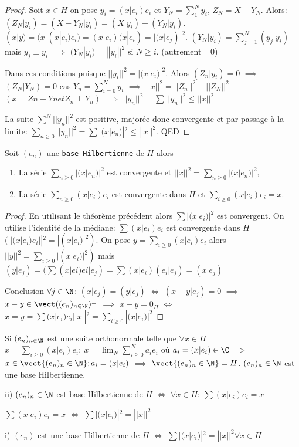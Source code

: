 \begin{proof}
	Soit $x\in H$ on pose $y_i=(x|e_i)e_i$ et $Y_N=∑_1^Ny_i$, $Z_N=X-Y_N$. Alors: $(Z_N|y_i)=(X-Y_N|y_i)=(X|y_i)-(Y_N|y_i)$. $(x|y)=(x|(x|e_i)e_i)=\overline{(x|e_i)}(x|e_i)=|(x|e_j)|^2$. $(Y_N|y_i)=∑_{j=1}^N(y_j|y_i)$ mais $y_j\perp y_i$ $\implies$  $(Y_N|y_i) =||y_i||^2$ si $N≥i$.
	(autrement =0)

Dans ces conditions puisque $||y_i||^2=|(x|e_i)|^2$. Alors $(Z_n|y_i)=0$ $\implies$  $(Z_N|Y_N)=0$ cas $Y_n=∑_{i=0}^Ny_i$ $\implies$  $||x||^2=||Z_n||^2+||Z_N||^2$ $(x=Zn+Yn et Z_n\perp Y_n)$
$\implies$  $||y_n||^2=∑||y_n||^2≤||x||^2$


La suite $∑^N||y_n||^2$ est positive, majorée donc convergente et par passage à la limite: $∑_{n≥0}||y_n||^2=∑|(x|e_n)|^2≤||x||^2$. QED
\end{proof}

\begin{theorem}
	Soit $(e_n)$ une \texttt{base Hilbertienne} de $H$ alors 
	\begin{enumerate}
		\item La série $∑_{n≥0}|(x|e_n)|^2$ est convergente et $||x||^2=∑_{n≥0}|(x|e_n)|^2$,
		\item La série $∑_{n≥0}(x|e_i)e_i$ est convergente dans $H$ et $∑_{i≥0}(x|e_i)e_i=x$.
	\end{enumerate}
\end{theorem}
\begin{proof}
	En utilisant le théorème précédent alors $∑|(x|e_i)|^2$ est convergent. On utilise l'identité de la médiane: $∑(x|e_i)e_i$ est convergente dans $H$ $(||(x|e_i)e_i||^2 =|(x|e_i)|^2)$.
	On pose $y=∑_{i≥0}(x|e_i)e_i$ alors $||y||^2 =∑_{i≥0}|(x|e_i)|^2)$ mais $(y|e_j)=(∑(x|ei)ei|e_j)=∑(x|e_i)(e_i|e_j)=(x|e_j)$
	
	Conclusion $\forall j\in \N$: $(x|e_j)=(y|e_j)$ $\iff$
	$ (x-y|e_j)=0$ $\implies$  $x-y\in\vect((e_n)_{n\in\N})^\perp$
	$\implies$  $x-y=0_H$ $\iff$ $x=y=∑(x|e_i) e_i ||x||^2=∑_{i≥0}|(x|e_i)|^2$
\end{proof}
\begin{remark}
	Si $(e_n)_{n\in \N}$ est une suite orthonormale telle que $\forall x\in H$ $x=∑_{i≥0}(x|e_i)e_i:\ x=\lim_N ∑_{i≥0}^N a_ie_i$ où $a_i=(x|e_i)\in\C$ =>
	$x \in \vect\{(e_n)_n\in \N\}; a_i=(x|e_i)$ $\implies$  $\vect\{(e_n)_n\in\N\}=H$. $(e_n)_n\in \N$ est une base Hilbertienne.
	
	ii) $(e_n)_n\in\N$ est base Hilbertienne de $H$ $\iff$ $\forall x\in H:\ ∑(x|e_i)e_i=x $
	
	$∑(x|e_i)e_i=x$ $\iff$ $∑|(x|e_i)|^2=||x||^2 $ 
	
	i) $(e_n)$ est une base Hilbertienne de $H$ $\iff$ $∑|(x|e_i)|^2=||x||^2 \forall x\in H$
\end{remark}

